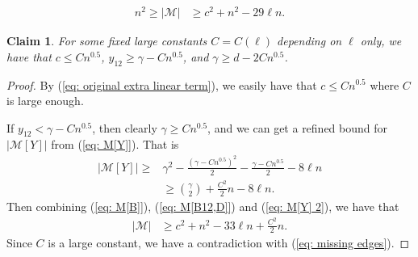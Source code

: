 \documentclass[10pt,a4paper]{amsart}
\newtheorem{claim}{Claim}
\begin{document}
	\begin{equation}\label{eq: original extra linear term}
	\begin{aligned}
		n^2 \ge |\mathcal{M}| & \ge c^2 + n^2 - 29\ell n.
	\end{aligned}
	\end{equation}

\begin{claim}\label{claim: lower bound of gamma y}
	For some fixed large constants $C = C(\ell)$ depending on $\ell$ only, we have that $c \le C n^{0.5}$,  $y_{12} \ge \gamma - C n^{0.5}$, and $\gamma \ge d - 2C n^{0.5}$.
\end{claim}

\begin{proof}
	By (\ref{eq: original extra linear term}), we easily have that $c \le C n^{0.5}$ where $C$ is large enough.

	If $y_{12} < \gamma - C n^{0.5}$, then clearly $\gamma \ge Cn^{0.5}$, and we can get a refined bound for $|\mathcal{M}[Y]|$ from (\ref{eq: M[Y]}). That is
	\begin{equation}\label{eq: M[Y] 2}
	\begin{aligned}
		|\mathcal{M}[Y]| \ge & \gamma^2 - \frac{(\gamma - C n^{0.5})^2}{2} - \frac{\gamma - C n^{0.5}}{2} - 8\ell n \\
		& \ge \binom{\gamma}{2} + \frac{C^2}{2} n - 8\ell n.
	\end{aligned}
	\end{equation}
		Then combining (\ref{eq: M[B]}), (\ref{eq: M[B12,D]}) and (\ref{eq: M[Y] 2}), we have that
	\begin{equation}\label{eq: lb M}
	\begin{aligned}
		 |\mathcal{M}| & \ge c^2 + n^2 - 33\ell n  +\frac{C^2}{2}n.
	\end{aligned}
	\end{equation}
	Since $C$ is a large constant, we have a contradiction with (\ref{eq: missing edges}).


\end{proof}
\end{document}
